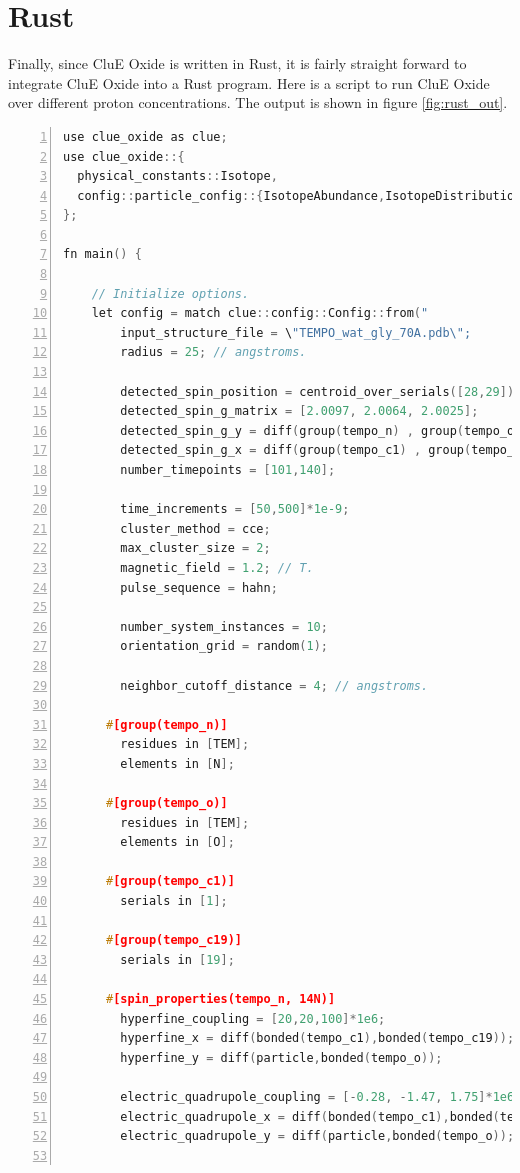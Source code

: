 \documentclass{book}
\begin{document}
\section{Rust}
Finally, since CluE Oxide is written in Rust, it is fairly straight forward to 
integrate CluE Oxide into a Rust program. 
Here is a script to run CluE Oxide over different proton concentrations.
The output is shown in figure \ref{fig:rust_out}.
\begin{lstlisting}[frame=single,numbers=left,language=c]
use clue_oxide as clue;
use clue_oxide::{
  physical_constants::Isotope,
  config::particle_config::{IsotopeAbundance,IsotopeDistribution}
};

fn main() {

    // Initialize options.
    let config = match clue::config::Config::from("
        input_structure_file = \"TEMPO_wat_gly_70A.pdb\";
        radius = 25; // angstroms.

        detected_spin_position = centroid_over_serials([28,29]);
        detected_spin_g_matrix = [2.0097, 2.0064, 2.0025];
        detected_spin_g_y = diff(group(tempo_n) , group(tempo_o) );
        detected_spin_g_x = diff(group(tempo_c1) , group(tempo_c19) );
        number_timepoints = [101,140];

        time_increments = [50,500]*1e-9;
        cluster_method = cce;
        max_cluster_size = 2;
        magnetic_field = 1.2; // T.
        pulse_sequence = hahn;

        number_system_instances = 10;
        orientation_grid = random(1);

        neighbor_cutoff_distance = 4; // angstroms.

      #[group(tempo_n)]
        residues in [TEM];
        elements in [N];

      #[group(tempo_o)]
        residues in [TEM];
        elements in [O];

      #[group(tempo_c1)]
        serials in [1];

      #[group(tempo_c19)]
        serials in [19];

      #[spin_properties(tempo_n, 14N)]
        hyperfine_coupling = [20,20,100]*1e6;
        hyperfine_x = diff(bonded(tempo_c1),bonded(tempo_c19));
        hyperfine_y = diff(particle,bonded(tempo_o));

        electric_quadrupole_coupling = [-0.28, -1.47, 1.75]*1e6;
        electric_quadrupole_x = diff(bonded(tempo_c1),bonded(tempo_c19));
        electric_quadrupole_y = diff(particle,bonded(tempo_o));


\end{lstlisting}
\end{document}
